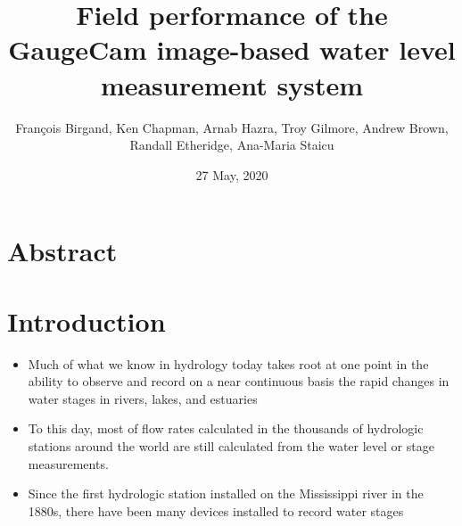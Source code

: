\documentclass[]{article}
\title{Field performance of the GaugeCam image-based water level measurement system}
\author{François Birgand, Ken Chapman, Arnab Hazra, Troy Gilmore, Andrew Brown, Randall Etheridge, Ana-Maria Staicu}
\date{27 May, 2020}
\providecommand{\tightlist}{%
  \setlength{\itemsep}{0pt}\setlength{\parskip}{0pt}}
\begin{document}
\maketitle

{
\setcounter{tocdepth}{2}
\tableofcontents
}
\hypertarget{abstract}{%
\section{Abstract}\label{abstract}}

\hypertarget{introduction}{%
\section{Introduction}\label{introduction}}

\begin{itemize}
\tightlist
\item
  Much of what we know in hydrology today takes root at one point in the ability to observe and record on a near continuous basis the rapid changes in water stages in rivers, lakes, and estuaries
\item
  To this day, most of flow rates calculated in the thousands of hydrologic stations around the world are still calculated from the water level or stage measurements.
\item
  Since the first hydrologic station installed on the Mississippi river in the 1880s, there have been many devices installed to record water stages


\end{itemize}
\end{document}
